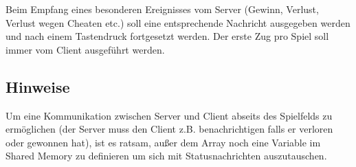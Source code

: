 Beim Empfang eines besonderen Ereignisses vom Server (Gewinn, Verlust, Verlust wegen
Cheaten etc.) soll eine entsprechende Nachricht ausgegeben werden und nach einem
Tastendruck fortgesetzt werden. Der erste Zug pro Spiel soll immer vom Client ausgeführt werden.


\subsection*{Hinweise}
Um eine Kommunikation zwischen Server und Client abseits des Spielfelds zu ermöglichen
(der Server muss den Client z.B. benachrichtigen falls er verloren oder gewonnen hat),
ist es ratsam, außer dem Array noch eine Variable im Shared Memory zu definieren um sich
mit Statusnachrichten auszutauschen.

\osueguidelinesthree



